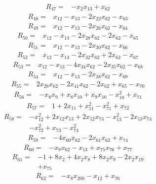\begin{align*} R_{47}={}&-x_{2}x_{13} +x_{62}
\end{align*}
\begin{align*} R_{48}={}&x_{12} -x_{13} -2 x_{22}x_{62} -x_{63}
\end{align*}
\begin{align*} R_{49}={}&x_{12} -x_{13} -2 x_{26}x_{62} -x_{64}
\end{align*}
\begin{align*} R_{50}={}&x_{12} -x_{13} -2 x_{28}x_{62} -2 x_{62} -x_{65}
\end{align*}
\begin{align*} R_{51}={}&x_{12} -x_{13} -2 x_{30}x_{62} -x_{66}
\end{align*}
\begin{align*} R_{52}={}&x_{12} -x_{13} -2 x_{32}x_{62} +2 x_{62} -x_{67}
\end{align*}
\begin{align*} R_{53}={}&x_{12} -x_{13} -4 x_{34}x_{62} -2 x_{35}x_{62} -x_{68}
\end{align*}
\begin{align*} R_{54}={}&x_{12} -x_{13} -2 x_{38}x_{62} -x_{69}
\end{align*}
\begin{align*} R_{55}={}&2 x_{28}x_{62} -2 x_{41}x_{62} -2 x_{62} +x_{65} -x_{70}
\end{align*}
\begin{align*} R_{56}={}&-x_{8}x_{9} +x_{8}x_{10} +x_{9}x_{10} -x_{10}^{2} +x_{71}
\end{align*}
\begin{align*} R_{57}={}&1 +2 x_{11} +x_{11}^{2} -x_{71}^{2} +x_{72}
\end{align*}
\begin{align*} R_{58}={}&-x_{12}^{2} +2 x_{12}x_{13} +2 x_{12}x_{74} -x_{13}^{2} -2 x_{13}x_{74}
\\ &-x_{72}^{2} +x_{73} -x_{74}^{2}
\end{align*}
\begin{align*} R_{59}={}&-4 x_{60}x_{62} -2 x_{61}x_{62} +x_{74}
\end{align*}
\begin{align*} R_{60}={}&-x_{9}x_{62} -x_{13} +x_{75}x_{76} +x_{77}
\end{align*}
\begin{align*} R_{61}={}&-1 +8 x_{2} +4 x_{2}x_{8} +8 x_{2}x_{9} -2 x_{2}x_{19}
\\ &+x_{75}
\end{align*}
\begin{align*} R_{62}={}&-x_{8}x_{200} -x_{12} +x_{76}
\end{align*}
